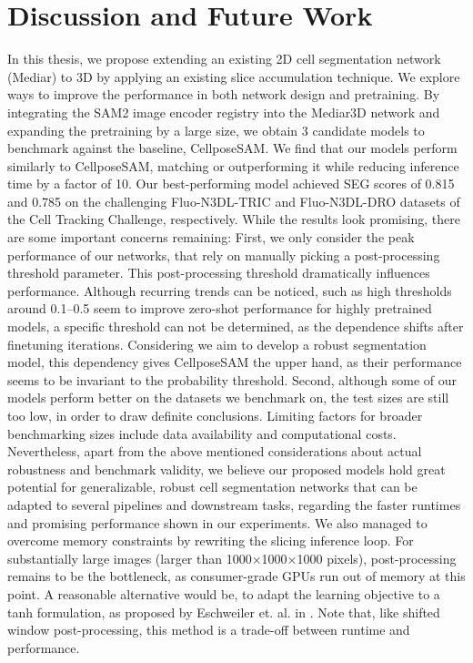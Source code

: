 \chapter{Discussion and Future Work}

In this thesis, we propose extending an existing 2D cell segmentation network (Mediar) to 3D by applying an existing slice accumulation technique. We explore ways to improve the performance in both network design and pretraining. By integrating the SAM2 image encoder registry into the Mediar3D network and expanding the pretraining by a large size, we obtain 3 candidate models to benchmark against the baseline, CellposeSAM. We find that our models perform similarly to CellposeSAM, matching or outperforming it while reducing inference time by a factor of 10. Our best-performing model achieved SEG scores of 0.815 and 0.785 on the challenging Fluo-N3DL-TRIC and Fluo-N3DL-DRO datasets of the Cell Tracking Challenge, respectively. While the results look promising, there are some important concerns remaining: First, we only consider the peak performance of our networks, that rely on manually picking a post-processing threshold parameter. This post-processing threshold dramatically influences performance. Although recurring trends can be noticed, such as high thresholds around 0.1–0.5 seem to improve zero-shot performance for highly pretrained models, a specific threshold can not be determined, as the dependence shifts after finetuning iterations. Considering we aim to develop a robust segmentation model, this dependency gives CellposeSAM the upper hand, as their performance seems to be invariant to the probability threshold. Second, although some of our models perform better on the datasets we benchmark on, the test sizes are still too low, in order to draw definite conclusions. Limiting factors for broader benchmarking sizes include data availability and computational costs. Nevertheless, apart from the above mentioned considerations about actual robustness and benchmark validity, we believe our proposed models hold great potential for generalizable, robust cell segmentation networks that can be adapted to several pipelines and downstream tasks, regarding the faster runtimes and promising performance shown in our experiments. We also managed to overcome memory constraints by rewriting the slicing inference loop. For substantially large images (larger than 1000×1000×1000 pixels), post-processing remains to be the bottleneck, as consumer-grade GPUs run out of memory at this point. A reasonable alternative would be, to adapt the learning objective to a tanh formulation, as proposed by  Eschweiler et. al. in \cite{eschweiler2022robust3dcellsegmentation}. Note that, like shifted window post-processing, this method is a trade-off between runtime and performance. 
